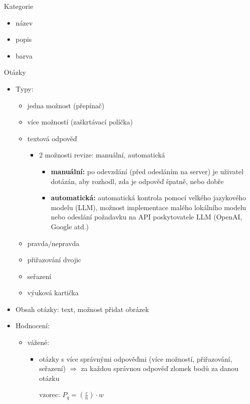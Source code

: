 \documentclass{vskpou} %
\begin{document}
Kategorie
\begin{itemize}
    \item název
    \item popis
    \item barva
\end{itemize}

Otázky
\begin{itemize}
    \item Typy:
    \begin{itemize}
        \item jedna možnost (přepínač)
        \item více možností (zaškrtávací políčka)
        \item textová odpověď
        \begin{itemize}
            \item 2 možnosti revize: manuální, automatická
            \begin{itemize}
                \item \textbf{manuální:} po odevzdání (před odesláním na server) je uživatel dotázán, aby rozhodl, zda je odpověď špatně, nebo dobře
                \item \textbf{automatická:} automatická kontrola pomocí velkého jazykového modelu (LLM), možnost implementace malého lokálního modelu nebo odeslání požadavku na API poskytovatele LLM (OpenAI, Google atd.)
            \end{itemize}
        \end{itemize}
        \item pravda/nepravda
        \item přiřazování dvojic
        \item seřazení
        \item výuková kartička
    \end{itemize}
    \item Obsah otázky: text, možnost přidat obrázek
    \item Hodnocení:
    \begin{itemize}
        \item vážené:
        \begin{itemize}
            \item otázky s více správnými odpověďmi (více možností, přiřazování, seřazení) $\Rightarrow$ za každou správnou odpověď zlomek bodů za danou otázku
            
            vzorec: $P_q = (\frac{c}{n}) \cdot w$
            

\end{itemize}
\end{itemize}
\end{itemize}
\end{document}
